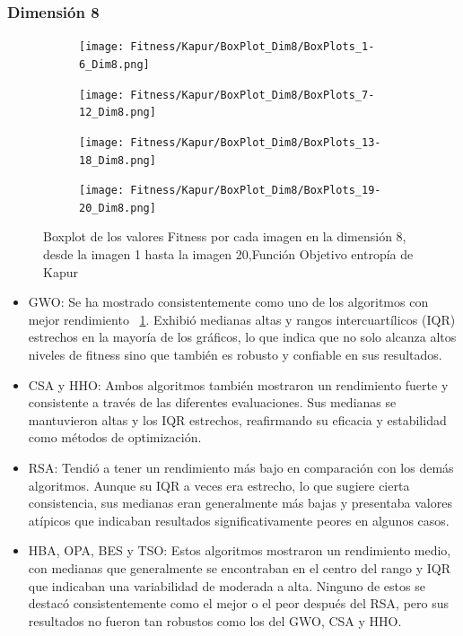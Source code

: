 \documentclass[conference]{IEEEtran}
\begin{document}
\subsubsection{Dimensión 8}
\begin{figure}
	\centering
	
	\begin{subfigure}{0.415\textwidth}
		\texttt{[image: Fitness/Kapur/BoxPlot\_Dim8/BoxPlots\_1-6\_Dim8.png]}
	\end{subfigure}
	
	\begin{subfigure}{0.415\textwidth}
		\texttt{[image: Fitness/Kapur/BoxPlot\_Dim8/BoxPlots\_7-12\_Dim8.png]}
	\end{subfigure}
	\begin{subfigure}{0.415\textwidth}
		\texttt{[image: Fitness/Kapur/BoxPlot\_Dim8/BoxPlots\_13-18\_Dim8.png]}
	\end{subfigure}
	\begin{subfigure}{0.415\textwidth}
		\texttt{[image: Fitness/Kapur/BoxPlot\_Dim8/BoxPlots\_19-20\_Dim8.png]}
		\vspace{-120pt} %
	\end{subfigure}
	\caption{Boxplot de los valores Fitness por cada imagen en la dimensión 8, desde la imagen 1 hasta la imagen 20,Función Objetivo entropía de Kapur}
	\label{fig:Boxplot_Fitnes_Dim8_Kapur}    
\end{figure}
\begin{itemize}
\item GWO: Se ha mostrado consistentemente como uno de los algoritmos con mejor rendimiento ~\ref{fig:Boxplot_Fitnes_Dim8_Kapur}. Exhibió medianas altas y rangos intercuartílicos (IQR) estrechos en la mayoría de los gráficos, lo que indica que no solo alcanza altos niveles de fitness sino que también es robusto y confiable en sus resultados.
\item CSA y HHO: Ambos algoritmos también mostraron un rendimiento fuerte y consistente a través de las diferentes evaluaciones. Sus medianas se mantuvieron altas y los IQR estrechos, reafirmando su eficacia y estabilidad como métodos de optimización.

\item RSA: Tendió a tener un rendimiento más bajo en comparación con los demás algoritmos. Aunque su IQR a veces era estrecho, lo que sugiere cierta consistencia, sus medianas eran generalmente más bajas y presentaba valores atípicos que indicaban resultados significativamente peores en algunos casos.

\item HBA, OPA, BES y TSO: Estos algoritmos mostraron un rendimiento medio, con medianas que generalmente se encontraban en el centro del rango y IQR que indicaban una variabilidad de moderada a alta. Ninguno de estos se destacó consistentemente como el mejor o el peor después del RSA, pero sus resultados no fueron tan robustos como los del GWO, CSA y HHO.
\end{itemize}
\end{document}
